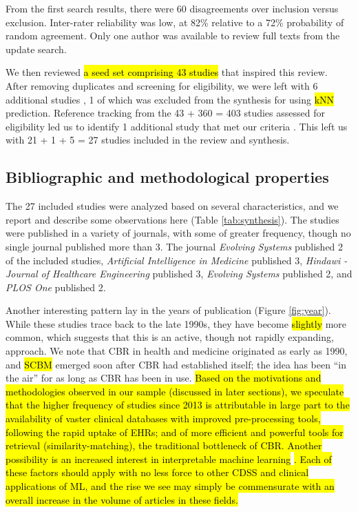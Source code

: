 \documentclass[sn-mathphys,Numbered,pdflatex]{sn-jnl}
\theoremstyle{remark}
\theoremstyle{definition}
\begin{document}
From the first search results, there were 60 disagreements over
inclusion versus exclusion. Inter-rater reliability was low, at 82\%
relative to a 72\% probability of random agreement. Only one author was
available to review full texts from the update search.

We then reviewed \hl{a seed set comprising 43 studies} that inspired
this review. After removing duplicates and screening for eligibility, we
were left with 6 additional studies
\citep{Park2006, Lowsky2013, Lee2015, Ng2015, Lee2017, Wang2019}, 1 of
which was excluded from the synthesis for using \hl{kNN} prediction.
Reference tracking from the 43 + 360 = 403 studies assessed for
eligibility led us to identify 1 additional study that met our criteria
\citep{Kasabov2010}. This left us with 21 + 1 + 5 = 27 studies included
in the review and synthesis.

\subsection{Bibliographic and methodological
properties}\label{bibliographic-and-methodological-properties}

The 27 included studies were analyzed based on several characteristics,
and we report and describe some observations here (Table
\ref{tab:synthesis}). The studies were published in a variety of
journals, with some of greater frequency, though no single journal
published more than 3. The journal \emph{Evolving Systems} published 2
of the included studies, \emph{Artificial Intelligence in Medicine}
published 3, \emph{Hindawi - Journal of Healthcare Engineering}
published 3, \emph{Evolving Systems} published 2, and \emph{PLOS One}
published 2.

Another interesting pattern lay in the years of publication (Figure
\ref{fig:year}). While these studies trace back to the late 1990s, they
have become \hl{slightly }more common, which suggests that this is an
active, though not rapidly expanding, approach. We note that CBR in
health and medicine originated as early as 1990, and \hl{SCBM} emerged
soon after CBR had established itself; the idea has been ``in the air''
for as long as CBR has been in use.
\hl{ Based on the motivations and methodologies observed in our sample (discussed in later sections), we speculate that the higher frequency of studies since 2013 is attributable in large part to the availability of vaster clinical databases with improved pre-processing tools, following the rapid uptake of EHRs; and of more efficient and powerful tools for retrieval (similarity-matching), the traditional bottleneck of CBR. Another possibility is an increased interest in interpretable machine learning }\citep{Rudin2022}\hl{. Each of these factors should apply with no less force to other CDSS and clinical applications of ML, and the rise we see may simply be commensurate with an overall increase in the volume of articles in these fields.}
\end{document}
